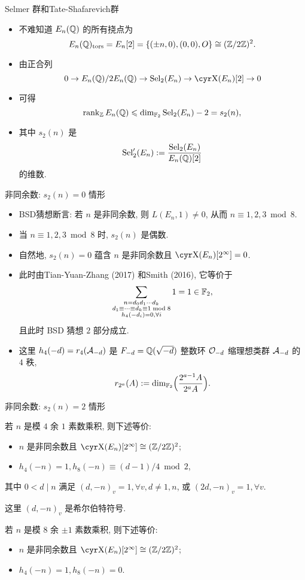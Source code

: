 \documentclass[aspectratio=169]{ctexbeamer}
\begin{document}
\begin{frame}{Selmer 群和Tate-Shafarevich群}
	\begin{itemize}
		\item 不难知道 $E_n({\mathbb{Q}})$ 的所有挠点为
		\[
			E_n({\mathbb{Q}})_{{\mathrm{tors}}}
			=E_n[2]
			=\{(\pm n,0),(0,0),O\}
			\cong({\mathbb{Z}}/2{\mathbb{Z}})^2.
		\]
		\item 由正合列
		\[
			0\ra E_n(\BQ)/2E_n(\BQ)\ra \Sel_2(E_n)\ra \Sha(E_n)[2]\ra0
		\]
		\item 可得
		\[
			\operatorname{rank}_{\mathbb{Z}} E_n({\mathbb{Q}})\leqslant \dim_{{\mathbb{F}}_2}{\mathrm{Sel}}_2(E_n)-2=s_2(n),
		\]
		\item 其中 $s_2(n)$ 是
		\[
			{\mathrm{Sel}}'_2(E_n):=\frac{{\mathrm{Sel}}_2(E_n)}{E_n({\mathbb{Q}})[2]}
		\]
		的维数.
	\end{itemize}
\end{frame}


\begin{frame}{非同余数: $s_2(n)=0$ 情形}
	\begin{itemize}
		\item BSD猜想断言: 若 $n$ 是非同余数, 则 $L(E_n,1)\ne 0$, 从而 $n\equiv 1,2,3\bmod 8$.
		\item 当 $n\equiv 1,2,3\bmod 8$ 时, $s_2(n)$ 是偶数.
		\item 自然地, $s_2(n)=0$ 蕴含 $n$ 是非同余数且 $\Sha(E_n)[2^\infty]=0$.
		\item 此时由Tian-Yuan-Zhang (2017) 和Smith (2016), 它等价于
		\[
			\sum_{\substack{n=d_0d_1\cdots d_k\\ d_1\equiv\dots\equiv d_k\equiv 1\bmod 8\\ h_4(-d_i)=0,\forall i}}1=1\in{\mathbb{F}}_2,
		\]
		且此时 BSD 猜想 $2$ 部分成立.
		\item 这里 $h_4(-d)=r_4({\mathcal{A}}_{-d})$ 是 $F_{-d}={\mathbb{Q}}(\sqrt{-d})$ 整数环 ${\mathcal{O}}_{-d}$ 缩理想类群 ${\mathcal{A}}_{-d}$ 的 $4$ 秩, 
		\[
			r_{2^a}(A):=\dim_{{\mathbb{F}}_2}\Bigl(\frac{2^{a-1} A}{2^a A}\Bigr).
		\]
	\end{itemize}
\end{frame}


\begin{frame}{非同余数: $s_2(n)=2$ 情形}
	\onslide<+->
	\begin{theorem}[{Wang 2016}]
		若 $n$ 是模 $4$ 余 $1$ 素数乘积, 则下述等价:
		\begin{itemize}[<*>]
			\item $n$ 是非同余数且 $\Sha(E_n)[2^\infty]\cong(\BZ/2\BZ)^2$;
			\item $h_4(-n)=1,h_8(-n)\equiv (d-1)/4\bmod 2$,
		\end{itemize}
		其中 $0<d\mid n$ 满足 $(d,-n)_v=1,\forall v, d\ne 1,n$, 或 $(2d,-n)_v=1,\forall v$.
	\end{theorem}
	这里 $(d,-n)_v$ 是希尔伯特符号.
	\onslide<+->
	\begin{theorem}
		若 $n$ 是模 $8$ 余 $\pm1$ 素数乘积, 则下述等价:
		\begin{itemize}[<*>]
			\item $n$ 是非同余数且 $\Sha(E_n)[2^\infty]\cong(\BZ/2\BZ)^2$;
			\item $h_4(-n)=1, h_8(-n)=0$.
		\end{itemize}
	\end{theorem}
\end{frame}
\end{document}
